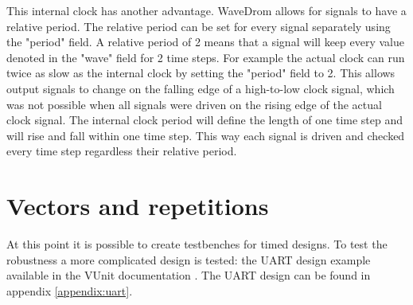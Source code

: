 \npar
This internal clock has another advantage. WaveDrom allows for signals to have a relative period. The relative period can be set for every signal separately using the "period" field. A relative period of 2 means that a signal will keep every value denoted in the "wave" field for 2 time steps. For example the actual clock can run twice as slow as the internal clock by setting the "period" field to 2. This allows output signals to change on the falling edge of a high-to-low clock signal, which was not possible when all signals were driven on the rising edge of the actual clock signal. The internal clock period will define the length of one time step and will rise and fall within one time step. This way each signal is driven and checked every time step regardless their relative period.
\section{Vectors and repetitions}
At this point it is possible to create testbenches for timed designs. To test the robustness a more complicated design is tested: the UART design example available in the VUnit documentation \cite{vunit_doc}. The UART design can be found in appendix \ref{appendix:uart}.
